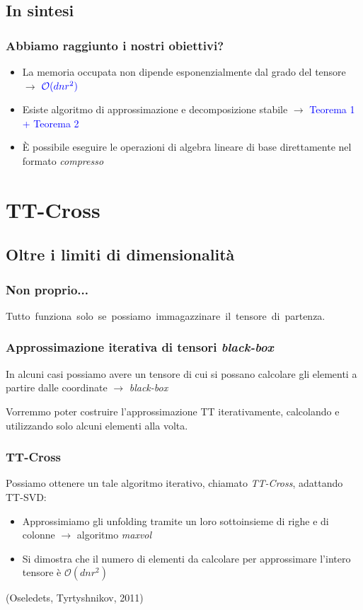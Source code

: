 \documentclass[compress]{beamer}
\theoremstyle{definition}
\theoremstyle{plain}
\begin{document}
\subsection{In sintesi}
\begin{frame}
\frametitle{Abbiamo raggiunto i nostri obiettivi?}
\begin{itemize}
\item La memoria occupata non dipende esponenzialmente dal grado del tensore $\rightarrow$ {$\color{blue} \mathcal{O}(dnr^2)$} \color{black}
\item Esiste algoritmo di approssimazione e decomposizione stabile $\rightarrow$ \textcolor{blue}{Teorema 1 + Teorema 2}
\item \`E possibile eseguire le operazioni di algebra lineare di base direttamente nel formato \emph{compresso}
\end{itemize}
\end{frame}

\section{TT-Cross}
\subsection{Oltre i limiti di dimensionalità}
\begin{frame}
\frametitle{Non proprio...}
\pause
\alert{Tutto~funziona~solo~se~possiamo~immagazzinare~il~tensore~di~partenza.}
\end{frame}

\begin{frame}
\frametitle{Approssimazione iterativa di tensori \emph{black-box}}
In alcuni casi possiamo avere un tensore di cui si possano calcolare gli elementi a partire dalle coordinate $\rightarrow$ \emph{black-box}

\vspace{10mm}
Vorremmo poter costruire l'approssimazione TT iterativamente, calcolando e utilizzando solo alcuni elementi alla volta.
\end{frame}

\begin{frame}
\frametitle{TT-Cross}
Possiamo ottenere un tale algoritmo iterativo, chiamato \emph{TT-Cross}, adattando TT-SVD:
\begin{itemize}
	\item Approssimiamo gli unfolding tramite un loro sottoinsieme di righe e di colonne $\rightarrow$ algoritmo \emph{maxvol}
	\item Si dimostra che il numero di elementi da calcolare per approssimare l'intero tensore è $\mathcal{O}(dnr^2)$
\end{itemize}

\vspace{5mm}
(Oseledets, Tyrtyshnikov, 2011)
\end{frame}
\end{document}
